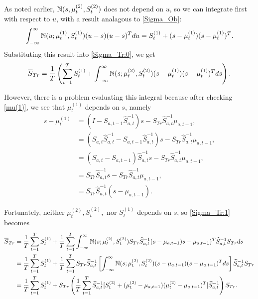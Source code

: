 \documentclass[12pt,leqno]{article}
\begin{document}
As noted earlier, ${\mathbb N}(s,\mu^{(2)}_t,S^{(2)}_t)$ does not depend on $u$, so we can integrate first with respect to $u$, with a result
analagous to \eqref{Sigma_Ob}:
$$
  \int_{-\infty}^{\infty}{\mathbb N}(u;\mu^{(1)}_t,S^{(1)}_t)(u-s)(u-s)^Tdu = S^{(1)}_t + (s-\mu^{(1)}_t)(s-\mu^{(1)}_t)^T.
$$
Substituting this result into \eqref{Sigma_Tr:0}, we get
\begin{equation}\label{Sigma_Tr:1}
  \overline{S}_{Tr} =  \frac{1}{T}\left(\sum_{t=1}^TS^{(1)}_t +\int_{-\infty}^{\infty}{\mathbb N}(s;\mu^{(2)}_t,S^{(2)}_t)
  (s-\mu^{(1)}_t)(s-\mu^{(1)}_t)^Tds\right).
\end{equation}

However, there is a problem evaluating this integral because after checking \eqref{mu(1)}, we see that $\mu^{(1)}_t$
depends on $s$, namely  
\begin{equation}\label{s-mu_1}
    \begin{split}
s - \mu^{(1)}_t &= (I - S_{a,t-1}\widehat{S}_{a,t}^{-1})s - S_{Tr}\widehat{S}_{a,t}^{-1}\mu_{a,t-1}, \\
  &= (\widehat{S}_{a,t}\widehat{S}_{a,t}^{-1} - S_{a,t-1}\widehat{S}_{a,t}^{-1})s  - 
  S_{Tr}\widehat{S}_{a,t}^{-1}\mu_{a,t-1},\\
  &= (\widehat{S}_{a,t} - S_{a,t-1})\widehat{S}_{a,t}^{-1}s - S_{Tr}\widehat{S}_{a,t}^{-1}\mu_{a,t-1},\\
  &= S_{Tr}\widehat{S}_{a,t}^{-1}s - S_{Tr}\widehat{S}_{a,t}^{-1}\mu_{a,t-1},\\
  &= S_{Tr}\widehat{S}_{a,t}^{-1}(s - \mu_{a,t-1}).
    \end{split}
\end{equation}


Fortunately, neither $\mu^{(2)}_t,S^{(2)}_t,$ nor $S^{(1)}_t$ depends on $s$,
so \eqref{Sigma_Tr:1} becomes
\begin{align}
  \overline{S}_{Tr} &= \frac{1}{T}\sum_{t=1}^TS^{(1)}_t + \frac{1}{T}\sum_{t=1}^T
    \int_{-\infty}^{\infty}{\mathbb N}(s;\mu^{(2)}_t,S^{(2)}_t)S_{Tr}\widehat{S}_{a,t}^{-1}(s-\mu_{a,t-1})
    s-\mu_{a,t-1})^T\widehat{S}_{a,t}^{-1}S_{Tr}ds\notag\\
    &=\frac{1}{T}\sum_{t=1}^TS^{(1)}_t +\frac{1}{T}\sum_{t=1}^TS_{Tr}\widehat{S}_{a,t}^{-1}
    \left[\int_{-\infty}^{\infty}{\mathbb N}(s;\mu^{(2)}_t,S^{(2)}_t)(s-\mu_{a,t-1})(s-\mu_{a,t-1})^Tds\right]\widehat{S}_{a,t}^{-1}S_{Tr}\notag\\
   &=\frac{1}{T}\sum_{t=1}^TS^{(1)}_t+S_{Tr}\left(\frac{1}{T}\sum_{t=1}^T\widehat{S}_{a,t}^{-1}
   [S^{(2)}_t+(\mu^{(2)}_t-\mu_{a,t-1})(\mu^{(2)}_t-\mu_{a,t-1})^T]\widehat{S}_{a,t}^{-1}\right)S_{Tr}.\label{Sigma_Tr:2}
  \end{align}
\end{document}

